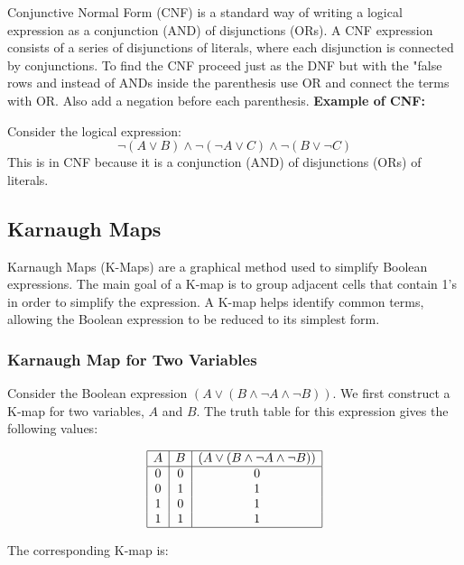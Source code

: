 Conjunctive Normal Form (CNF) is a standard way of writing a logical expression as a conjunction (AND)
of disjunctions (ORs). A CNF expression consists of a series of disjunctions of
literals, where each disjunction is connected by conjunctions.
\newline
To find the CNF proceed just as the DNF but with the "false rows and instead
of ANDs inside the parenthesis use OR and connect the terms with OR. Also add a negation before each parenthesis.
\newline
\textbf{Example of CNF:}

Consider the logical expression:
\[
	\neg (A \lor B) \land \neg (\neg A \lor C) \land \neg (B \lor \neg C)
\]
This is in CNF because it is a conjunction (AND) of disjunctions (ORs) of literals.

\subsection{Karnaugh Maps}

Karnaugh Maps (K-Maps) are a graphical method used to simplify Boolean expressions. The main goal of a K-map is to group adjacent cells that contain 1's in order to simplify the expression. A K-map helps identify common terms, allowing the Boolean expression to be reduced to its simplest form.

\subsubsection*{Karnaugh Map for Two Variables}

Consider the Boolean expression \( (A \lor (B \land \neg A \land \neg B)) \).
\newline
We first construct a K-map for two variables, \( A \) and \( B \). The truth table for this expression gives the following values:

\[
	\begin{array}{|c|c|c|}
		\hline
		A & B & (A \lor (B \land \neg A \land \neg B)) \\
		\hline
		0 & 0 & 0                                      \\
		0 & 1 & 1                                      \\
		1 & 0 & 1                                      \\
		1 & 1 & 1                                      \\
		\hline
	\end{array}
\]

The corresponding K-map is:

